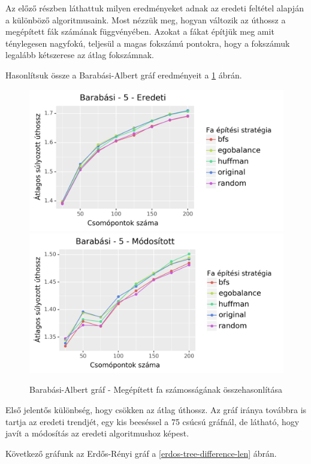 \documentclass[12pt]{report}
\begin{document}
Az előző részben láthattuk milyen eredményeket adnak az eredeti feltétel alapján a különböző algoritmusaink.
Most nézzük meg, hogyan változik az úthossz a megépített fák számának függvényében. 
Azokat a fákat építjük meg amit ténylegesen nagyfokú, teljesül a magas fokszámú pontokra, hogy a fokszámuk legalább kétszerese az átlag fokszámnak.

Hasonlítsuk össze a Barabási-Albert gráf eredményeit a \ref{barabasi-tree-difference-len} ábrán.

\begin{figure}[H]
	\begin{center}
		\includegraphics[width=0.49\linewidth]{pictures/barabasi_len_e.png}
		\includegraphics[width=0.49\linewidth]{pictures/barabasi_len_m.png}
		\caption{Barabási-Albert gráf - Megépített fa számosságának összehasonlítása}
		\label{barabasi-tree-difference-len}
	\end{center}
\end{figure}

Első jelentős különbség, hogy csökken az átlag úthossz.
Az gráf iránya továbbra is tartja az eredeti trendjét, egy kis beeséssel a 75 csúcsú gráfnál, de látható, hogy javít a módosítás az eredeti algoritmushoz képest.

Következő gráfunk az Erdős-Rényi gráf a \ref{erdos-tree-difference-len} ábrán.
\end{document}
